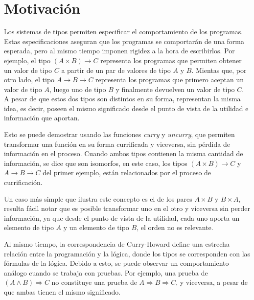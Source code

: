 \section{Motivación}

Los sistemas de tipos permiten especificar el comportamiento de los programas.
Estas especificaciones aseguran que los programas se comportarán de una forma esperada, pero al mismo tiempo imponen rigidez a la hora de escribirlos.
Por ejemplo, el tipo $(A \times B) \rightarrow C$ representa los programas que permiten obtener un valor de tipo $C$ a partir de un par de valores de tipo $A$ y $B$.
Mientas que, por otro lado, el tipo $A \rightarrow B \rightarrow C$ representa los programas que primero aceptan un valor de tipo $A$, luego uno de tipo $B$ y finalmente devuelven un valor de tipo $C$.
A pesar de que estos dos tipos son distintos en su forma, representan la misma idea, es decir, poseen el mismo significado desde el punto de vista de la utilidad e información que aportan.

Esto se puede demostrar usando las funciones \textit{curry} y \textit{uncurry}, que permiten transformar una función en su forma currificada y viceversa, sin pérdida de información en el proceso.
Cuando ambos tipos contienen la misma cantidad de información, se dice que son isomorfos, en este caso, los tipos $(A \times B) \rightarrow C$ y $A \rightarrow B \rightarrow C$ del primer ejemplo, están relacionados por el proceso de currificación.

Un caso más simple que ilustra este concepto es el de los pares $A \times B$ y $B \times A$, resulta fácil notar que es posible transformar uno en el otro y viceversa sin perder información, ya que desde el punto de vista de la utilidad, cada uno aporta un elemento de tipo $A$ y un elemento de tipo $B$, el orden no es relevante.

Al mismo tiempo, la correspondencia de Curry-Howard \cite{sorensen2006lectures} define una estrecha relación entre la programación y la lógica, donde los tipos se corresponden con las fórmulas de la lógica.
Debido a esto, se puede observar un comportamiento análogo cuando se trabaja con pruebas.
Por ejemplo, una prueba de $(A \wedge B) \Rightarrow C$ no constituye una prueba de $A \Rightarrow B \Rightarrow C$, y viceversa, a pesar de que ambas tienen el mismo significado.

